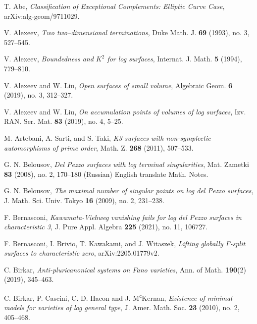 \documentclass[11pt]{amsart}
\numberwithin{equation}{section}
\theoremstyle{definition}
\theoremstyle{definition}
\theoremstyle{definition}
\begin{document}
\begin{thebibliography}{ABCDE}

 T. Abe, \textit{Classification of Exceptional Complements: Elliptic Curve Case}, arXiv:alg-geom/9711029.

 V. Alexeev, \textit{Two two--dimensional terminations}, Duke Math. J. \textbf{69} (1993), no. 3, 527--545.

 V. Alexeev, \textit{Boundedness and $K^2$ for log surfaces}, Internat. J. Math. \textbf{5} (1994), 779--810.

 V. Alexeev and W. Liu, \textit{Open surfaces of small volume}, Algebraic Geom. \textbf{6} (2019), no. 3, 312--327.

 V. Alexeev and W. Liu, \textit{On accumulation points of volumes of log surfaces}, Izv. RAN. Ser. Mat. \textbf{83} (2019), no. 4, 5--25.

 M. Artebani, A. Sarti, and S. Taki, \textit{K3 surfaces with non-symplectic automorphisms of prime order}, Math. Z. \textbf{268} (2011), 507--533.

 G. N. Belousov, \textit{Del Pezzo surfaces with log terminal singularities}, Mat. Zametki \textbf{83} (2008), no. 2, 170--180 (Russian) English translate Math. Notes.

 G. N. Belousov, \textit{The maximal number of singular points on log del Pezzo surfaces}, J. Math. Sci. Univ. Tokyo \textbf{16} (2009), no. 2, 231--238.

 F. Bernasconi, \textit{Kawamata-Viehweg vanishing fails for log del Pezzo surfaces in characteristic 3}, J. Pure Appl. Algebra \textbf{225} (2021), no. 11, 106727.

 F. Bernasconi, I. Brivio, T. Kawakami, and J. Witaszek, \textit{Lifting globally F-split surfaces to characteristic zero}, arXiv:2205.01779v2.

 C. Birkar, \textit{Anti-pluricanonical systems on Fano varieties}, Ann. of Math. \textbf{190}(2) (2019), 345--463.



	
C. Birkar, P. Cascini, C. D. Hacon and J. M\textsuperscript{c}Kernan, \textit{Existence of minimal models for varieties of log general type}, J. Amer. Math. Soc. \textbf{23} (2010), no. 2, 405--468.


\end{thebibliography}
\end{document}
